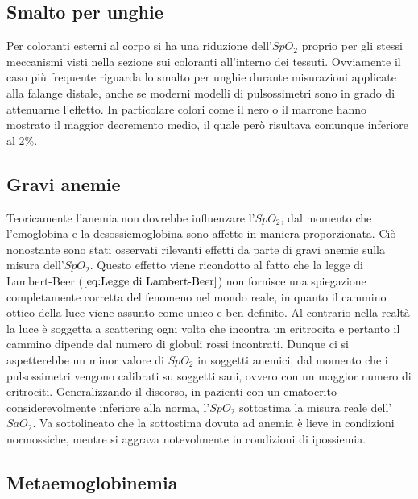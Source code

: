 \documentclass[12pt,a4paper, twoside, openright]{report}
\begin{document}
\subsection{Smalto per unghie}

Per coloranti esterni al corpo si ha una riduzione dell'$SpO_2$ proprio per gli stessi meccanismi visti nella sezione sui coloranti all'interno dei tessuti. 
Ovviamente il caso più frequente riguarda lo smalto per unghie durante misurazioni applicate alla falange distale, anche se moderni modelli di pulsossimetri sono in grado di attenuarne l'effetto. 
In particolare colori come il nero o il marrone hanno mostrato il maggior decremento medio, il quale però risultava comunque inferiore al 2\%.%


\subsection{Gravi anemie}

Teoricamente l'anemia non dovrebbe influenzare l'$SpO_2$, dal momento che l'emoglobina e la desossiemoglobina sono affette in maniera proporzionata. 
Ciò nonostante sono stati osservati rilevanti effetti da parte di gravi anemie sulla misura dell'$SpO_2$. 
Questo effetto viene ricondotto al fatto che la legge di Lambert-Beer ($\ref{eq:Legge di Lambert-Beer}$) non fornisce una spiegazione completamente corretta del fenomeno nel mondo reale, in quanto il cammino ottico della luce viene assunto come unico e ben definito. 
Al contrario nella realtà la luce è soggetta a scattering ogni volta che incontra un eritrocita e pertanto il cammino dipende dal numero di globuli rossi incontrati. 
Dunque ci si aspetterebbe un minor valore di $SpO_2$ in soggetti anemici, dal momento che i pulsossimetri vengono calibrati su soggetti sani, ovvero con un maggior numero di eritrociti. 
Generalizzando il discorso, in pazienti con un ematocrito considerevolmente inferiore alla norma, l'$SpO_2$ sottostima la misura reale dell'$SaO_2$. 
Va sottolineato che la sottostima dovuta ad anemia è lieve in condizioni normossiche, mentre si aggrava notevolmente in condizioni di ipossiemia.


\subsection{Metaemoglobinemia}
\end{document}
